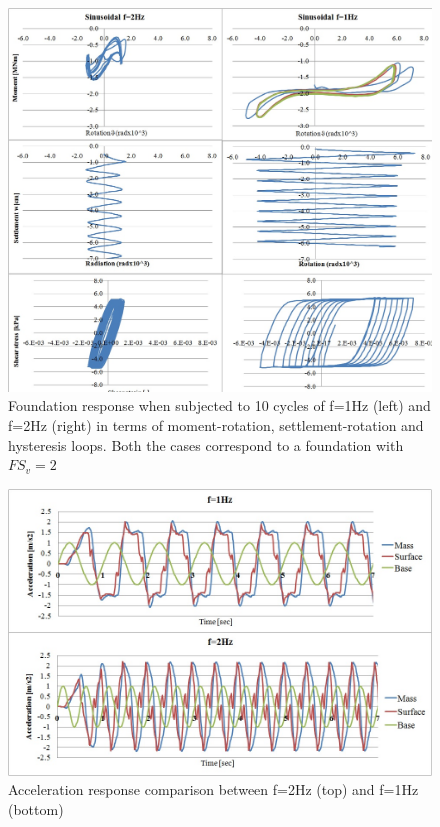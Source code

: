  \begin{figure}[!h]
 	\centering
 	\includegraphics[width=0.8\linewidth]{"2hz"}
 	\caption{Foundation response when subjected to 10 cycles of f=1Hz (left) and f=2Hz (right) in terms of moment-rotation, settlement-rotation and hysteresis loops. Both the cases correspond to a foundation with $FS_v=2$}
 	\label{2hz}
 \end{figure}
 
 \begin{figure}[!h]
 	\centering
 	\includegraphics[width=0.6\linewidth]{"acc-2hz"}
 	\caption{Acceleration response comparison between f=2Hz (top) and f=1Hz (bottom)}
 	\label{acc2hz}
 \end{figure}

